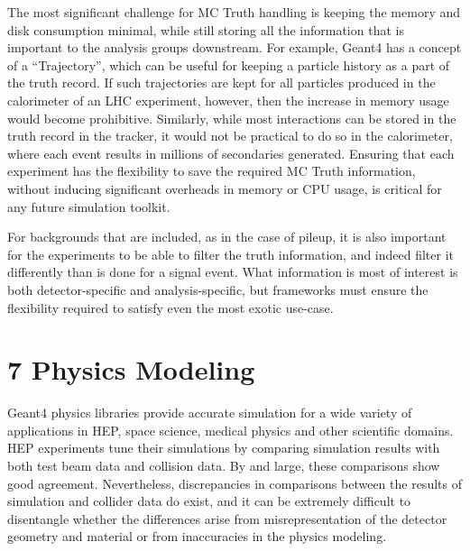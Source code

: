 \documentclass[12pt,a4paper]{article}
\begin{document}
The most significant challenge for MC Truth handling is keeping the
memory and disk consumption minimal, while still storing all the
information that is important to the analysis groups downstream. For
example, Geant4 has a concept of a ``Trajectory'', which can be useful
for keeping a particle history as a part of the truth record. If such
trajectories are kept for all particles produced in the calorimeter of
an LHC experiment, however, then the increase in memory usage would
become prohibitive. Similarly, while most interactions can be stored in
the truth record in the tracker, it would not be practical to do so in
the calorimeter, where each event results in millions of secondaries
generated. Ensuring that each experiment has the flexibility to save the
required MC Truth information, without inducing significant overheads in
memory or CPU usage, is critical for any future simulation toolkit.

For backgrounds that are included, as in the case of pileup, it is also
important for the experiments to be able to filter the truth
information, and indeed filter it differently than is done for a signal
event. What information is most of interest is both detector-specific
and analysis-specific, but frameworks must ensure the flexibility
required to satisfy even the most exotic use-case.

\hypertarget{physics-modeling}{%
\section{7 Physics Modeling}\label{physics-modeling}}

Geant4 physics libraries provide accurate simulation for a wide variety
of applications in HEP, space science, medical physics and other
scientific domains. HEP experiments tune their simulations by comparing
simulation results with both test beam data and collision data. By and
large, these comparisons show good agreement. Nevertheless,
discrepancies in comparisons between the results of simulation and
collider data do exist, and it can be extremely difficult to disentangle
whether the differences arise from misrepresentation of the detector
geometry and material or from inaccuracies in the physics modeling.
\end{document}

